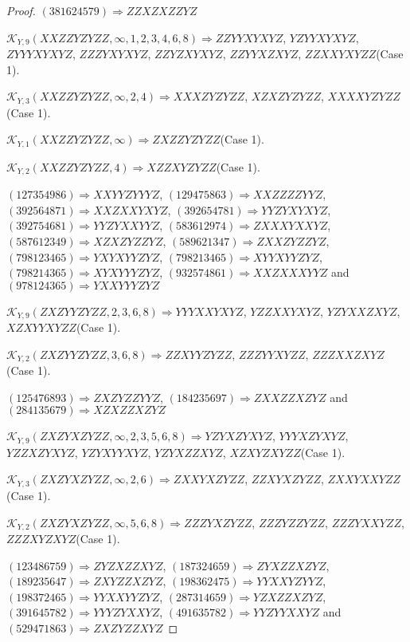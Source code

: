 \documentclass[12pt]{article}
\theoremstyle{plain}
\theoremstyle{definition}
\theoremstyle{remark}
\newcommand{\fancy}[1]{\mathcal{#1}}
\def\K{\fancy{K}}
\begin{document}
\begin{proof}
	
	
	$(3 8 1 6 2 4 5 7 9)\Rightarrow ZZXZXZZYZ$
	
	
	$\K_{Y,9}(XXZZYZYZZ,\infty,1, 2, 3, 4, 6, 8)\Rightarrow $$ZZYYXYXYZ$, $YZYYXYXYZ$, $ZYYYXYXYZ$, $ZZZYXYXYZ$, $ZZYZXYXYZ$, $ZZYYXZXYZ$, $ZZXXYXYZZ$(Case 1).
	
	$\K_{Y,3}(XXZZYZYZZ,\infty,2, 4)\Rightarrow $$XXXZYZYZZ$, $XZXZYZYZZ$, $XXXXYZYZZ$(Case 1).
	
	$\K_{Y,1}(XXZZYZYZZ,\infty)\Rightarrow $$ZXZZYZYZZ$(Case 1).
	
	$\K_{Y,2}(XXZZYZYZZ,4)\Rightarrow $$XZZXYZYZZ$(Case 1).
	
	
	
	$(1 2 7 3 5 4 9 8 6)\Rightarrow XXYYZYYYZ$, $(1 2 9 4 7 5 8 6 3)\Rightarrow XXZZZZYYZ$, $(3 9 2 5 6 4 8 7 1)\Rightarrow XXZXXYXYZ$, $(3 9 2 6 5 4 7 8 1)\Rightarrow YYZYXYXYZ$, $(3 9 2 7 5 4 6 8 1)\Rightarrow YYZYXXYYZ$, $(5 8 3 6 1 2 9 7 4)\Rightarrow ZXXXYXXYZ$, $(5 8 7 6 1 2 3 4 9)\Rightarrow XZXZYZZYZ$, $(5 8 9 6 2 1 3 4 7)\Rightarrow ZXXZYZZYZ$, $(7 9 8 1 2 3 4 6 5)\Rightarrow YXYXYYZYZ$, $(7 9 8 2 1 3 4 6 5)\Rightarrow XYYXYYZYZ$, $(7 9 8 2 1 4 3 6 5)\Rightarrow XYXYYYZYZ$, $(9 3 2 5 7 4 8 6 1)\Rightarrow XXZXXXYYZ$ and $(9 7 8 1 2 4 3 6 5)\Rightarrow YXXYYYZYZ$
	
	
	$\K_{Y,9}(ZXZYYZYZZ,2, 3, 6, 8)\Rightarrow $$YYYXXYXYZ$, $YZZXXYXYZ$, $YZYXXZXYZ$, $XZXYYXYZZ$(Case 1).
	
	$\K_{Y,2}(ZXZYYZYZZ,3, 6, 8)\Rightarrow $$ZZXYYZYZZ$, $ZZZYYXYZZ$, $ZZZXXZXYZ$(Case 1).
	
	
	
	$(1 2 5 4 7 6 8 9 3)\Rightarrow ZXZYZZYYZ$, $(1 8 4 2 3 5 6 9 7)\Rightarrow ZXXZZXZYZ$ and $(2 8 4 1 3 5 6 7 9)\Rightarrow XZXZZXZYZ$
	
	
	$\K_{Y,9}(ZXZYXZYZZ,\infty,2, 3, 5, 6, 8)\Rightarrow $$YZYXZYXYZ$, $YYYXZYXYZ$, $YZZXZYXYZ$, $YZYXYYXYZ$, $YZYXZZXYZ$, $XZXYZXYZZ$(Case 1).
	
	$\K_{Y,3}(ZXZYXZYZZ,\infty,2, 6)\Rightarrow $$ZXXYXZYZZ$, $ZZXYXZYZZ$, $ZXXYXXYZZ$(Case 1).
	
	$\K_{Y,2}(ZXZYXZYZZ,\infty,5, 6, 8)\Rightarrow $$ZZZYXZYZZ$, $ZZZYZZYZZ$, $ZZZYXXYZZ$, $ZZZXYZXYZ$(Case 1).
	
	
	
	$(1 2 3 4 8 6 7 5 9)\Rightarrow ZYZXZZXYZ$, $(1 8 7 3 2 4 6 5 9)\Rightarrow ZYXZZXZYZ$, $(1 8 9 2 3 5 6 4 7)\Rightarrow ZXYZZXZYZ$, $(1 9 8 3 6 2 4 7 5)\Rightarrow YYXXYZYYZ$, $(1 9 8 3 7 2 4 6 5)\Rightarrow YYXXYYZYZ$, $(2 8 7 3 1 4 6 5 9)\Rightarrow YZXZZXZYZ$, $(3 9 1 6 4 5 7 8 2)\Rightarrow YYYZYXXYZ$, $(4 9 1 6 3 5 7 8 2)\Rightarrow YYZYYXXYZ$ and $(5 2 9 4 7 1 8 6 3)\Rightarrow ZXZYZZXYZ$
	

\end{proof}
\end{document}
